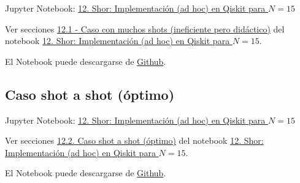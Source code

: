 \documentclass[a4paper,11pt]{book} %
\numberwithin{equation}{chapter}
\begin{document}
	\begin{mybox_orange}{Jupyter Notebook: \href{https://www.scbi.uma.es/web/wp-content/uploads/Jupyterbook/CICC_UMA/Notebooks/html/docs/Part_01/Chapter_12-Shor_Algorithm_simple_myst.html}{12. Shor: Implementación (ad hoc) en Qiskit para $N=15$}}


	Ver secciones \href{https://www.scbi.uma.es/web/wp-content/uploads/Jupyterbook/CICC_UMA/Notebooks/html/docs/Part_01/Chapter_12-Shor_Algorithm_simple_myst.html#caso-con-muchos-shots-ineficiente-pero-didactico}{12.1 - Caso con muchos shots (ineficiente pero didáctico)} del notebook \href{https://www.scbi.uma.es/web/wp-content/uploads/Jupyterbook/CICC_UMA/Notebooks/html/docs/Part_01/Chapter_12-Shor_Algorithm_simple_myst.html}{12. Shor: Implementación (ad hoc) en Qiskit para $N=15$}.
	
	El Notebook puede descargarse de \href{https://github.com/davidcb98/CICC_UMA/blob/master/Notebooks/Part_01/Chapter_12-Shor_Algorithm_simple.ipynb}{Github}.	
	\end{mybox_orange}



\subsection{Caso shot a shot (óptimo)} \label{sec_shot-a-shot}

	\begin{mybox_orange}{Jupyter Notebook: \href{https://www.scbi.uma.es/web/wp-content/uploads/Jupyterbook/CICC_UMA/Notebooks/html/docs/Part_01/Chapter_12-Shor_Algorithm_simple_myst.html}{12. Shor: Implementación (ad hoc) en Qiskit para $N=15$}}

	Ver secciones \href{https://www.scbi.uma.es/web/wp-content/uploads/Jupyterbook/CICC_UMA/Notebooks/html/docs/Part_01/Chapter_12-Shor_Algorithm_simple_myst.html#caso-shot-a-shot-optimo}{12.2. Caso shot a shot (óptimo)} del notebook \href{https://www.scbi.uma.es/web/wp-content/uploads/Jupyterbook/CICC_UMA/Notebooks/html/docs/Part_01/Chapter_12-Shor_Algorithm_simple_myst.html}{12. Shor: Implementación (ad hoc) en Qiskit para $N=15$}.
	
	El Notebook puede descargarse de \href{https://github.com/davidcb98/CICC_UMA/blob/master/Notebooks/Part_01/Chapter_12-Shor_Algorithm_simple.ipynb}{Github}.	
	\end{mybox_orange}

 
\end{document}
